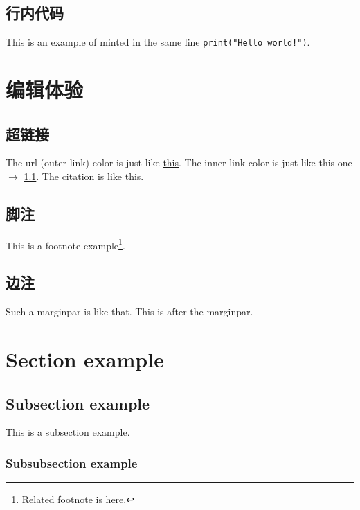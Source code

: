 \documentclass[fontset=none]{ctexart}
\begin{document}
\subsection{行内代码}

This is an example of minted in the same line \texttt{print("Hello world!")}.

\section{编辑体验}

\subsection{超链接}\label{sec:hyperlink}

The url (outer link) color is just like \href{https://chen-huaneng.github.io/}{this}. The inner link color is just like this one $\rightarrow$ \ref{sec:hyperlink}. The citation is like this\cite{2009A}.

\subsection{脚注}

This is a footnote example\footnote{Related footnote is here.}.

\subsection{边注}

Such a marginpar is like that.  This is after the marginpar.

\section{Section example}

\subsection{Subsection example}

This is a subsection example.

\subsubsection{Subsubsection example}
\end{document}

